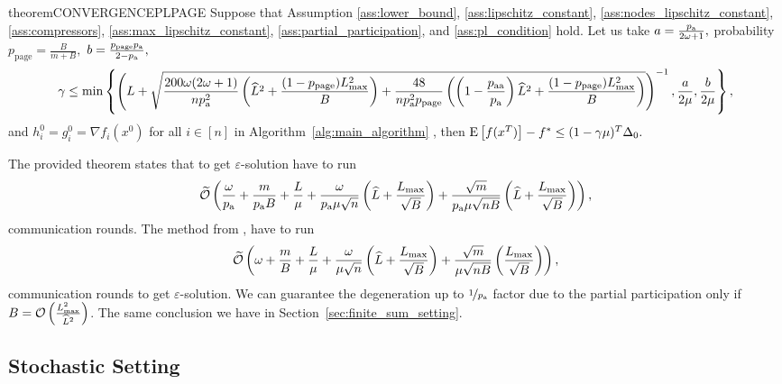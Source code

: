 \documentclass{article}
\newcommand{\algorithmname}{DARIA}
\newcommand*{\probavailable}{\ensuremath{p_{\textnormal{a}}}}
\newcommand*{\probpairaa}{\ensuremath{p_{\textnormal{aa}}}}
\newcommand*{\probpage}{\ensuremath{p_{\text{page}}}}
\begin{document}
\begin{restatable}{theorem}{CONVERGENCEPLPAGE}
  \label{theorem:page_pl}
  Suppose that Assumption \ref{ass:lower_bound}, \ref{ass:lipschitz_constant}, \ref{ass:nodes_lipschitz_constant}, \ref{ass:compressors}, \ref{ass:max_lipschitz_constant}, \ref{ass:partial_participation}, and \ref{ass:pl_condition} hold. Let us take $a = \frac{\probavailable}{2 \omega + 1},$ probability $\probpage = \frac{B}{m + B}, $ $b = \frac{\probpage \probavailable}{2 - \probavailable},$
  {\scriptsize $$\gamma \leq \min\left\{\left(L + \sqrt{\frac{200 \omega (2 \omega + 1)}{n \probavailable^2} \left(\widehat{L}^2 + \frac{(1 - \probpage)L_{\max}^2}{B}\right) + \frac{48}{n \probavailable^2 \probpage}\left(\left(1 - \frac{\probpairaa}{\probavailable}\right) \widehat{L}^2 + \frac{(1 - \probpage)L_{\max}^2}{B}\right)}\right)^{-1}, \frac{a}{2\mu} , \frac{b}{2\mu}\right\},$$}
  and $h^{0}_i = g^{0}_i = \nabla f_i(x^0)$ for all $i \in [n]$ in Algorithm~\ref{alg:main_algorithm} \algname{(\algorithmname-PAGE)},
  then ${\rm E}\left[f(x^{T})\right] - f^* \leq (1 - \gamma \mu)^{T} \Delta_0.$
\end{restatable}

The provided theorem states that to get $\varepsilon$-solution \algname{\algorithmname} have to run
\begin{align*}
  \widetilde{\cO}\left(\frac{\omega}{\probavailable} + \frac{m}{\probavailable B} + \frac{L}{\mu} + \frac{\omega}{\probavailable \mu \sqrt{n}} \left(\widehat{L} + \frac{L_{\max}}{\sqrt{B}}\right) + \frac{\sqrt{m}}{\probavailable \mu \sqrt{n B}} \left(\widehat{L} + \frac{L_{\max}}{\sqrt{B}}\right)\right),
\end{align*}
communication rounds. The method  from \citep{tyurin2022dasha}, have to run
\begin{align*}
  \widetilde{\mathcal{O}}\left(\omega + \frac{m}{B} + \frac{L}{\mu} + \frac{\omega}{\mu \sqrt{n}} \left(\widehat{L} + \frac{L_{\max}}{\sqrt{B}}\right) + \frac{\sqrt{m}}{\mu \sqrt{n B}} \left(\frac{L_{\max}}{\sqrt{B}}\right)\right),
\end{align*}
communication rounds to get $\varepsilon$-solution. We can guarantee the degeneration up to $\nicefrac{1}{\probavailable}$ factor due to the partial participation only if $B = \mathcal{O}\left(\frac{L_{\max}^2}{\widehat{L}^2}\right)$. The same conclusion we have in Section~\ref{sec:finite_sum_setting}.

\subsection{Stochastic Setting}
\end{document}
